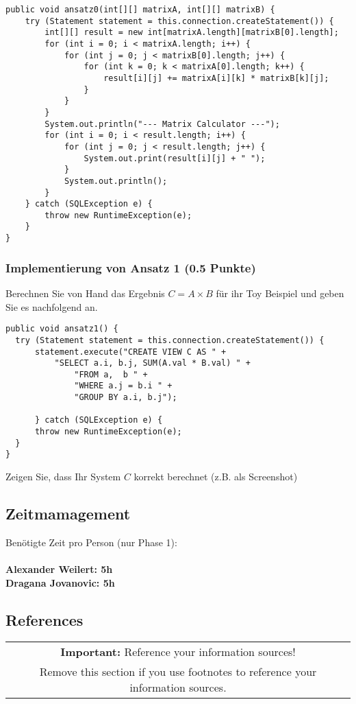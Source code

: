 \documentclass[11pt]{scrartcl}
\begin{document}
\begin{lstlisting}[style=dmrJava]
  public void ansatz0(int[][] matrixA, int[][] matrixB) {
    try (Statement statement = this.connection.createStatement()) {
        int[][] result = new int[matrixA.length][matrixB[0].length];
        for (int i = 0; i < matrixA.length; i++) {
            for (int j = 0; j < matrixB[0].length; j++) {
                for (int k = 0; k < matrixA[0].length; k++) {
                    result[i][j] += matrixA[i][k] * matrixB[k][j];
                }
            }
        }
        System.out.println("--- Matrix Calculator ---");
        for (int i = 0; i < result.length; i++) {
            for (int j = 0; j < result.length; j++) {
                System.out.print(result[i][j] + " ");
            }
            System.out.println();
        }
    } catch (SQLException e) {
        throw new RuntimeException(e);
    }
}
\end{lstlisting}


\subsubsection*{Implementierung von Ansatz 1 (0.5 Punkte)}
Berechnen Sie von Hand das Ergebnis $C = A \times B$ für ihr Toy Beispiel und geben Sie es nachfolgend an.

\begin{lstlisting}[style=dmrJava]
public void ansatz1() {
  try (Statement statement = this.connection.createStatement()) {
      statement.execute("CREATE VIEW C AS " +
          "SELECT a.i, b.j, SUM(A.val * B.val) " +
              "FROM a,  b " +
              "WHERE a.j = b.i " +
              "GROUP BY a.i, b.j");

      } catch (SQLException e) {
      throw new RuntimeException(e);
  }
}
\end{lstlisting}

Zeigen Sie, dass Ihr System $C$ korrekt berechnet (z.B. als Screenshot)

\subsection*{Zeitmamagement}

Benötigte Zeit pro Person (nur Phase 1): \\ \\
\textbf{Alexander Weilert: 5h} \\
\textbf{Dragana Jovanovic: 5h}

\subsection*{References}

\begin{table}[H]
  \centering
  \begin{tabular}{c}
    \hline
    \textbf{Important:} Reference your information sources! \tabularnewline
    Remove this section if you use footnotes to reference your information sources. \tabularnewline
    \hline
  \end{tabular}
\end{table}
\end{document}
